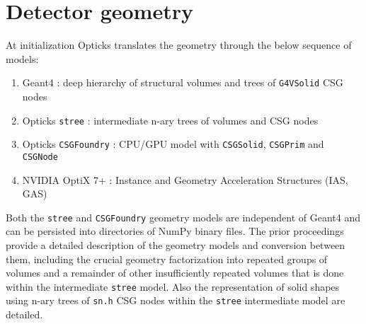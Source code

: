 \documentclass{webofc}
\begin{document}
\section{Detector geometry} 
\label{secgeom}%
At initialization Opticks translates the geometry through the below sequence of models:
%
\begin{enumerate}
\item Geant4 : deep hierarchy of structural volumes and trees of {\tt G4VSolid} CSG nodes
\item Opticks {\tt stree} : intermediate n-ary trees of volumes and CSG nodes
\item Opticks {\tt CSGFoundry} : CPU/GPU model with {\tt CSGSolid}, {\tt CSGPrim} and {\tt CSGNode} 
\item NVIDIA OptiX 7+ : Instance and Geometry Acceleration Structures (IAS, GAS)
\end{enumerate}  
%
%
Both the {\tt stree} and {\tt CSGFoundry} geometry models are independent of Geant4 and can be persisted into directories of NumPy\cite{numpy} binary files. 
The prior proceedings\cite{chep2023} provide a detailed description of the geometry models and conversion between them,
including the crucial geometry factorization into repeated groups of volumes and a remainder of 
other insufficiently repeated volumes that is done within the intermediate {\tt stree} model.
Also the representation of solid shapes using n-ary trees of {\tt sn.h} CSG nodes within  
the {\tt stree} intermediate model are detailed. 
%
%
%
\end{document}
